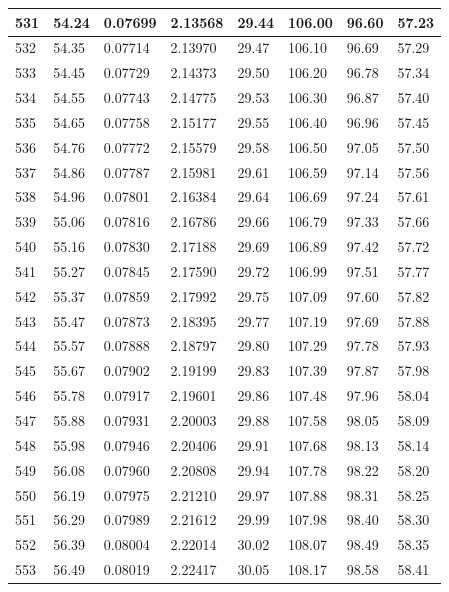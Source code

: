 \documentclass[12pt,a4paper,twoside]{article}
\begin{document}
\begin{center}
\begin{longtable}{l l l l | l l l l}
531 & 54.24 & 0.07699 & 2.13568 & 29.44 & 106.00 & 96.60 & 57.23 \\ \hline
532 & 54.35 & 0.07714 & 2.13970 & 29.47 & 106.10 & 96.69 & 57.29 \\ \hline
533 & 54.45 & 0.07729 & 2.14373 & 29.50 & 106.20 & 96.78 & 57.34 \\ \hline
534 & 54.55 & 0.07743 & 2.14775 & 29.53 & 106.30 & 96.87 & 57.40 \\ \hline
535 & 54.65 & 0.07758 & 2.15177 & 29.55 & 106.40 & 96.96 & 57.45 \\ \hline
536 & 54.76 & 0.07772 & 2.15579 & 29.58 & 106.50 & 97.05 & 57.50 \\ \hline
537 & 54.86 & 0.07787 & 2.15981 & 29.61 & 106.59 & 97.14 & 57.56 \\ \hline
538 & 54.96 & 0.07801 & 2.16384 & 29.64 & 106.69 & 97.24 & 57.61 \\ \hline
539 & 55.06 & 0.07816 & 2.16786 & 29.66 & 106.79 & 97.33 & 57.66 \\ \hline
540 & 55.16 & 0.07830 & 2.17188 & 29.69 & 106.89 & 97.42 & 57.72 \\ \hline
541 & 55.27 & 0.07845 & 2.17590 & 29.72 & 106.99 & 97.51 & 57.77 \\ \hline
542 & 55.37 & 0.07859 & 2.17992 & 29.75 & 107.09 & 97.60 & 57.82 \\ \hline
543 & 55.47 & 0.07873 & 2.18395 & 29.77 & 107.19 & 97.69 & 57.88 \\ \hline
544 & 55.57 & 0.07888 & 2.18797 & 29.80 & 107.29 & 97.78 & 57.93 \\ \hline
545 & 55.67 & 0.07902 & 2.19199 & 29.83 & 107.39 & 97.87 & 57.98 \\ \hline
546 & 55.78 & 0.07917 & 2.19601 & 29.86 & 107.48 & 97.96 & 58.04 \\ \hline
547 & 55.88 & 0.07931 & 2.20003 & 29.88 & 107.58 & 98.05 & 58.09 \\ \hline
548 & 55.98 & 0.07946 & 2.20406 & 29.91 & 107.68 & 98.13 & 58.14 \\ \hline
549 & 56.08 & 0.07960 & 2.20808 & 29.94 & 107.78 & 98.22 & 58.20 \\ \hline
550 & 56.19 & 0.07975 & 2.21210 & 29.97 & 107.88 & 98.31 & 58.25 \\ \hline
551 & 56.29 & 0.07989 & 2.21612 & 29.99 & 107.98 & 98.40 & 58.30 \\ \hline
552 & 56.39 & 0.08004 & 2.22014 & 30.02 & 108.07 & 98.49 & 58.35 \\ \hline
553 & 56.49 & 0.08019 & 2.22417 & 30.05 & 108.17 & 98.58 & 58.41 \\ \hline

\end{longtable}
\end{center}
\end{document}
